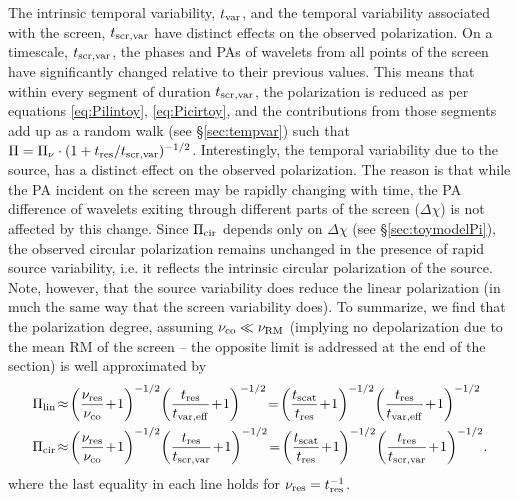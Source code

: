 \documentclass[fleqn,usenatbib]{mnras}
\begin{document}
	The intrinsic temporal variability, $t_{\rm var}$, and the temporal variability associated with the screen, $t_{\rm scr,var}$ have distinct effects on the observed polarization. On a timescale, $t_{\rm scr,var}$, the phases and PAs of wavelets from all points of the screen have significantly changed relative to their previous values. This means that within every segment of duration $t_{\rm scr,var}$, the polarization is reduced as per equations \ref{eq:Pilintoy}, \ref{eq:Picirtoy}, and the contributions from those segments add up as a random walk (see \S \ref{sec:tempvar}) such that $\Pi=\Pi_{\nu}\cdot (1+t_{\rm res}/t_{\rm scr,var})^{-1/2}$. Interestingly, the temporal variability due to the source, has a distinct effect on the observed polarization. The reason is that while the PA incident on the screen may be rapidly changing with time, the PA difference of wavelets exiting through different parts of the screen ($\Delta \chi$) is not affected by this change. Since $\Pi_{\rm cir}$ depends only on $\Delta \chi$ (see \S \ref{sec:toymodelPi}), the observed circular polarization remains unchanged in the presence of rapid source variability, i.e. it reflects the intrinsic circular polarization of the source. Note, however, that the source variability does reduce the linear polarization (in much the same way that the screen variability does). To summarize, we find that the polarization degree, assuming $\nu_{\rm co}\ll\nu_{\rm RM}$ (implying no depolarization due to the mean RM of the screen -- the opposite limit is addressed at the end of the section) is well approximated by
	\small
	\begin{eqnarray}
		\label{eq:Polgen}
		& \Pi_{\rm lin}\!\approx\! \bigg(\frac{\nu_{\rm res}}{\nu_{\rm co}}\!+
		\!1\bigg)^{-1/2}\bigg(\frac{t_{\rm res}}{t_{\rm var, eff}}\!+\!1\bigg)^{-1/2}\!=
		\!\bigg(\frac{t_{\rm scat}}{t_{\rm res}}\!+\!1\bigg)^{-1/2}\bigg(\frac{t_{\rm res}}{t_{\rm var, eff}}\!+\!1\bigg)^{-1/2} \\
		&   \Pi_{\rm cir}\!\approx\! \bigg(\frac{\nu_{\rm res}}{\nu_{\rm co}}\!+
		\!1\bigg)^{-1/2}\bigg(\frac{t_{\rm res}}{t_{\rm scr,var}}\!+\!1\bigg)^{-1/2}\!=
		\!\bigg(\frac{t_{\rm scat}}{t_{\rm res}}\!+\!1\bigg)^{-1/2}\bigg(\frac{t_{\rm res}}{t_{\rm scr,var}}\!+\!1\bigg)^{-1/2} \nonumber.
	\end{eqnarray}
	\normalsize
	where the last equality in each line holds for $\nu_{\rm res}=t_{\rm res}^{-1}$.
\end{document}
